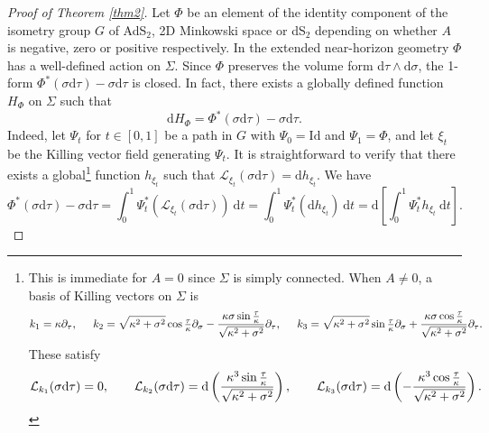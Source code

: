 \documentclass[11pt, reqno]{amsart}
\theoremstyle{plain}
\theoremstyle{definition}
\numberwithin{equation}{section}
\begin{document}
\begin{proof}[Proof of Theorem \ref{thm2}] 
Let $\Phi$ be an element of the identity component of the isometry group $G$ of AdS$_2$, 2D Minkowski space or dS$_2$ depending on whether $A$ is negative, zero or positive respectively. In the extended near-horizon geometry $\Phi$ has a well-defined action on $\Sigma$. Since $\Phi$ preserves the volume form d$\tau \wedge \text{d}\sigma$, the 1-form $\Phi^*(\sigma\text{d}\tau) - \sigma\text{d}\tau$ is closed. In fact, there exists a globally defined function $H_\Phi$ on $\Sigma$ such that
\begin{equation} \label{Hpsi}
    \text{d}H_\Phi = \Phi^*(\sigma\text{d}\tau) - \sigma\text{d}\tau.
\end{equation}
Indeed, let $\Psi_t$ for $t \in [0,1]$ be a path in $G$ with $\Psi_0 = \text{Id}$ and $\Psi_1 = \Phi$, and let $\xi_t$ be the Killing vector field generating $\Psi_t$. It is straightforward to verify that there exists a global\footnote{This is immediate for $A = 0$ since $\Sigma$ is simply connected. When $A \neq 0$, a basis of Killing vectors on $\Sigma$ is
\begin{equation*}
    k_1 = \kappa\partial_\tau, \hspace{.5cm} k_2 = \sqrt{\kappa^2 + \sigma^2}\cos\tfrac{\tau}{\kappa}\partial_\sigma - \frac{\kappa\sigma\sin\tfrac{\tau}{\kappa}}{\sqrt{\kappa^2 + \sigma^2}}\partial_\tau, \hspace{.5cm} k_3 = \sqrt{\kappa^2 + \sigma^2}\sin\tfrac{\tau}{\kappa}\partial_\sigma + \frac{\kappa\sigma\cos\tfrac{\tau}{\kappa}}{\sqrt{\kappa^2 + \sigma^2}}\partial_\tau.
\end{equation*} These satisfy
\begin{equation*}
    \mathcal{L}_{k_1} (\sigma\text{d}\tau) = 0, \hspace{.7cm} \mathcal{L}_{k_2} (\sigma\text{d}\tau) = \text{d}\left(\frac{\kappa^3\sin\tfrac{\tau}{\kappa}}{\sqrt{\kappa^2 + \sigma^2}}\right), \hspace{.7cm}  \mathcal{L}_{k_3} (\sigma\text{d}\tau) = \text{d}\left(-\frac{\kappa^3\cos\tfrac{\tau}{\kappa}}{\sqrt{\kappa^2 + \sigma^2}}\right).
\end{equation*}} function $h_{\xi_t}$ such that $\mathcal{L}_{\xi_t} (\sigma\text{d}\tau) = \text{d}h_{\xi_t}$. We have
\begin{equation*}
    \Phi^*(\sigma\text{d}\tau) - \sigma\text{d}\tau = \int_0^1\Psi_t^*(\mathcal{L}_{\xi_t} (\sigma\text{d}\tau))\:\text{d}t = \int_0^1\Psi_t^*(\text{d}h_{\xi_t})\:\text{d}t = \text{d}\left[\int_0^1\Psi_t^*h_{\xi_t} \:\text{d}t\right].

\end{equation*}
\end{proof}
\end{document}

